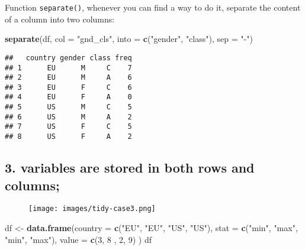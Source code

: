 \documentclass[]{book}
\newenvironment{Shaded}{\begin{snugshade}}{\end{snugshade}}
\newcommand{\KeywordTok}[1]{\textcolor[rgb]{0.13,0.29,0.53}{\textbf{{#1}}}}
\newcommand{\DataTypeTok}[1]{\textcolor[rgb]{0.13,0.29,0.53}{{#1}}}
\newcommand{\DecValTok}[1]{\textcolor[rgb]{0.00,0.00,0.81}{{#1}}}
\newcommand{\StringTok}[1]{\textcolor[rgb]{0.31,0.60,0.02}{{#1}}}
\newcommand{\NormalTok}[1]{{#1}}
\begin{document}
Function \texttt{separate()}, whenever you can find a way to do it,
separate the content of a column into two columns:

\begin{Shaded}
\begin{Highlighting}[]
\KeywordTok{separate}\NormalTok{(df, }\DataTypeTok{col =} \StringTok{"gnd_cls"}\NormalTok{, }\DataTypeTok{into =} \KeywordTok{c}\NormalTok{(}\StringTok{"gender"}\NormalTok{, }\StringTok{"class"}\NormalTok{), }\DataTypeTok{sep =} \StringTok{"-"}\NormalTok{)}
\end{Highlighting}
\end{Shaded}

\begin{verbatim}
##   country gender class freq
## 1      EU      M     C    7
## 2      EU      M     A    6
## 3      EU      F     C    6
## 4      EU      F     A    0
## 5      US      M     C    5
## 6      US      M     A    2
## 7      US      F     C    5
## 8      US      F     A    2
\end{verbatim}

\clearpage

\subsection{3. variables are stored in both rows and
columns;}\label{variables-are-stored-in-both-rows-and-columns}

\begin{figure}[htbp]
\centering
\texttt{[image: images/tidy-case3.png]}
\caption{}
\end{figure}

\begin{Shaded}
\begin{Highlighting}[]
\NormalTok{df <-}\StringTok{ }\KeywordTok{data.frame}\NormalTok{(}\DataTypeTok{country =} \KeywordTok{c}\NormalTok{(}\StringTok{"EU"}\NormalTok{, }\StringTok{"EU"}\NormalTok{, }\StringTok{"US"}\NormalTok{, }\StringTok{"US"}\NormalTok{),}
                 \DataTypeTok{stat =} \KeywordTok{c}\NormalTok{(}\StringTok{"min"}\NormalTok{, }\StringTok{"max"}\NormalTok{, }\StringTok{"min"}\NormalTok{, }\StringTok{"max"}\NormalTok{),}
                 \DataTypeTok{value =} \KeywordTok{c}\NormalTok{(}\DecValTok{3}\NormalTok{, }\DecValTok{8} \NormalTok{, }\DecValTok{2}\NormalTok{, }\DecValTok{9}\NormalTok{)}
                 \NormalTok{)}
\NormalTok{df}
\end{Highlighting}
\end{Shaded}
\end{document}
